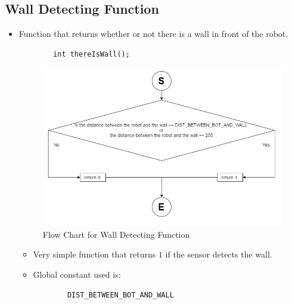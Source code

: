 \documentclass[11pt]{article}
\begin{document}

\subsection{Wall Detecting Function}
\begin{itemize}
\item Function that returns whether or not there is a wall in front of the robot.
	\begin{verbatim}
		int thereIsWall();
	\end{verbatim}
\begin{figure}[htp]
\centering
\includegraphics[scale=0.60]{images/Software_Flowchart/Detecting_Wall.png}
\caption{Flow Chart for Wall Detecting Function}
\label{}
\end{figure}
	\begin{itemize}
	\item Very simple function that returns $1$ if the sensor detects the wall.
	\item Global constant used is:
	\begin{verbatim}
		DIST_BETWEEN_BOT_AND_WALL
	\end{verbatim}
	\end{itemize}
\end{itemize}
\newpage

\end{document}
